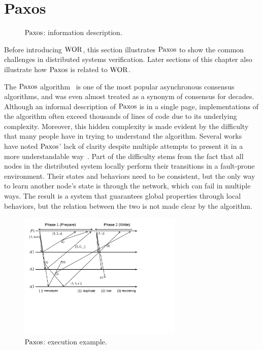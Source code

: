 \section{Paxos} 
\label{sec:paxos} 

\begin{figure}
\begin{minipage}{\linewidth}
\begin{multicols}{2}

\end{multicols}
\end{minipage}
\caption{$\mathrm{Paxos}$: information description.}
\label{fig:chapter:multipaxos:paxos-pseudocode}
\end{figure}

Before introducing $\mathrm{WOR}$,
this section illustrates $\mathrm{Paxos}$ to show the common challenges in distributed systems verification.
Later sections of this chapter also illustrate how $\mathrm{Paxos}$ is related to $\mathrm{WOR}$.

The $\mathrm{Paxos}$ algorithm~\cite{paxos}
is one of the most popular asynchronous consensus algorithms, and was even almost treated as a synonym of
consensus for decades.
Although an informal description of $\mathrm{Paxos}$ is in a single page,
implementations of the algorithm often exceed thousands of lines of code due to its underlying complexity.
Moreover, this hidden complexity is made evident by the difficulty that many people have in trying to understand the algorithm.
Several works~\cite{raft, rvrpaxos} have noted $\mathrm{Paxos}$' lack of clarity despite multiple attempts to present
it in a more understandable way~\cite{paxosmadesimple, Lampson1996, Lampson2001, dpaxos}.
Part of the difficulty stems from the fact that all nodes in the distributed system locally perform their transitions in a fault-prone environment.
Their states and behaviors need to be consistent, but
the only way to learn another node's state is through the network, which can fail in multiple ways.
The result is a system that guarantees global properties through local behaviors, but the relation between the two is not made clear by the algorithm.

\begin{figure}
\begin{center}
\includegraphics[width=0.7\textwidth]{figs/multipaxos/paxos_example_nowitness}
\end{center}
\caption{$\mathrm{Paxos}$: execution example.}
\label{fig:chapter:multipaxos:paxos-example}
\end{figure}

